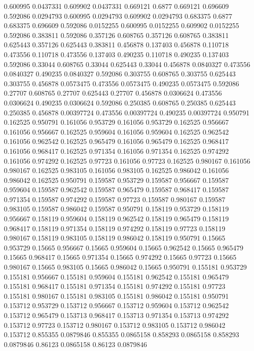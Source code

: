 0.600995 0.0437331
0.609902 0.0437331
0.669121 0.6877
0.669121 0.696609
0.592086 0.0294793
0.600995 0.0294793
0.609902 0.0294793
0.683375 0.6877
0.683375 0.696609
0.592086 0.0152255
0.600995 0.0152255
0.609902 0.0152255
0.592086 0.383811
0.592086 0.357126
0.608765 0.357126
0.608765 0.383811
0.625443 0.357126
0.625443 0.383811
0.456878 0.137403
0.456878 0.110718
0.473556 0.110718
0.473556 0.137403
0.490235 0.110718
0.490235 0.137403
0.592086 0.33044
0.608765 0.33044
0.625443 0.33044
0.456878 0.0840327
0.473556 0.0840327
0.490235 0.0840327
0.592086 0.303755
0.608765 0.303755
0.625443 0.303755
0.456878 0.0573475
0.473556 0.0573475
0.490235 0.0573475
0.592086 0.27707
0.608765 0.27707
0.625443 0.27707
0.456878 0.0306624
0.473556 0.0306624
0.490235 0.0306624
0.592086 0.250385
0.608765 0.250385
0.625443 0.250385
0.456878 0.00397724
0.473556 0.00397724
0.490235 0.00397724
0.950791 0.162525
0.950791 0.161056
0.953729 0.161056
0.953729 0.162525
0.956667 0.161056
0.956667 0.162525
0.959604 0.161056
0.959604 0.162525
0.962542 0.161056
0.962542 0.162525
0.965479 0.161056
0.965479 0.162525
0.968417 0.161056
0.968417 0.162525
0.971354 0.161056
0.971354 0.162525
0.974292 0.161056
0.974292 0.162525
0.97723 0.161056
0.97723 0.162525
0.980167 0.161056
0.980167 0.162525
0.983105 0.161056
0.983105 0.162525
0.986042 0.161056
0.986042 0.162525
0.950791 0.159587
0.953729 0.159587
0.956667 0.159587
0.959604 0.159587
0.962542 0.159587
0.965479 0.159587
0.968417 0.159587
0.971354 0.159587
0.974292 0.159587
0.97723 0.159587
0.980167 0.159587
0.983105 0.159587
0.986042 0.159587
0.950791 0.158119
0.953729 0.158119
0.956667 0.158119
0.959604 0.158119
0.962542 0.158119
0.965479 0.158119
0.968417 0.158119
0.971354 0.158119
0.974292 0.158119
0.97723 0.158119
0.980167 0.158119
0.983105 0.158119
0.986042 0.158119
0.950791 0.15665
0.953729 0.15665
0.956667 0.15665
0.959604 0.15665
0.962542 0.15665
0.965479 0.15665
0.968417 0.15665
0.971354 0.15665
0.974292 0.15665
0.97723 0.15665
0.980167 0.15665
0.983105 0.15665
0.986042 0.15665
0.950791 0.155181
0.953729 0.155181
0.956667 0.155181
0.959604 0.155181
0.962542 0.155181
0.965479 0.155181
0.968417 0.155181
0.971354 0.155181
0.974292 0.155181
0.97723 0.155181
0.980167 0.155181
0.983105 0.155181
0.986042 0.155181
0.950791 0.153712
0.953729 0.153712
0.956667 0.153712
0.959604 0.153712
0.962542 0.153712
0.965479 0.153713
0.968417 0.153713
0.971354 0.153713
0.974292 0.153712
0.97723 0.153712
0.980167 0.153712
0.983105 0.153712
0.986042 0.153712
0.855355 0.0879846
0.855355 0.0865158
0.858293 0.0865158
0.858293 0.0879846
0.86123 0.0865158
0.86123 0.0879846
